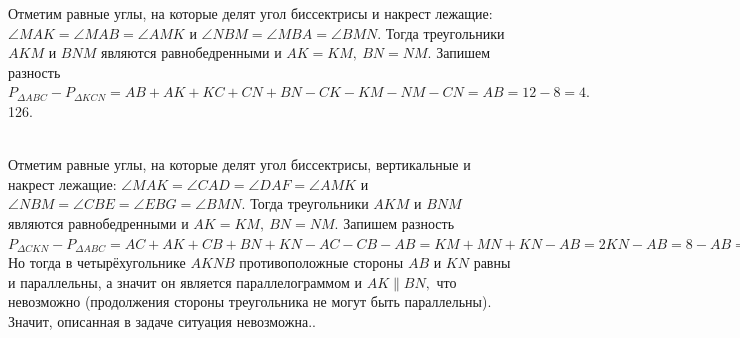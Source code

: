 \documentclass[12pt]{article}
\begin{document}
Отметим равные углы, на которые делят угол биссектрисы и накрест лежащие: $\angle MAK=\angle MAB=\angle AMK$ и $\angle NBM=\angle MBA=\angle BMN.$ Тогда треугольники $AKM$ и $BNM$ являются равнобедренными и $AK=KM,\ BN=NM.$ Запишем разность $P_{\Delta ABC}-P_{\Delta KCN}=AB+AK+KC+CN+BN-CK-KM-NM-CN=AB=12-8=4.$\\
126. \begin{figure}[ht!]
\end{figure}\\
Отметим равные углы, на которые делят угол биссектрисы, вертикальные и накрест лежащие: $\angle MAK=\angle CAD=\angle DAF=\angle AMK$ и $\angle NBM=\angle CBE=\angle EBG=\angle BMN.$ Тогда треугольники $AKM$ и $BNM$ являются равнобедренными и $AK=KM,\ BN=NM.$ Запишем разность $P_{\Delta CKN}-P_{\Delta ABC}=AC+AK+CB+BN+KN-AC-CB-AB=KM+MN+KN-AB=2KN-AB=8-AB=22-18,\ AB=4.$ Но тогда в четырёхугольнике $AKNB$ противоположные стороны $AB$ и $KN$ равны и параллельны, а значит он является параллелограммом и $AK\parallel BN,$ что невозможно (продолжения стороны треугольника не могут быть параллельны). Значит, описанная в задаче ситуация невозможна.\newpage{}. \begin{figure}[ht!]
\end{figure}\\
\end{document}
